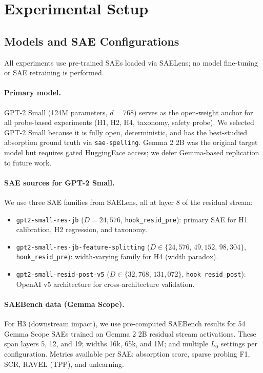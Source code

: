 \documentclass{article}
\begin{document}
\section{Experimental Setup}
\label{sec:setup}

\subsection{Models and SAE Configurations}

All experiments use pre-trained SAEs loaded via SAELens; no model fine-tuning or SAE retraining is performed.

\paragraph{Primary model.} GPT-2 Small (124M parameters, $d = 768$) serves as the open-weight anchor for all probe-based experiments (H1, H2, H4, taxonomy, safety probe). We selected GPT-2 Small because it is fully open, deterministic, and has the best-studied absorption ground truth via \texttt{sae-spelling}. Gemma 2 2B was the original target model but requires gated HuggingFace access; we defer Gemma-based replication to future work.

\paragraph{SAE sources for GPT-2 Small.} We use three SAE families from SAELens, all at layer 8 of the residual stream:
\begin{itemize}
  \item \texttt{gpt2-small-res-jb} ($D = 24{,}576$, \texttt{hook\_resid\_pre}): primary SAE for H1 calibration, H2 regression, and taxonomy.
  \item \texttt{gpt2-small-res-jb-feature-splitting} ($D \in \{24{,}576,\, 49{,}152,\, 98{,}304\}$, \texttt{hook\_resid\_pre}): width-varying family for H4 (width paradox).
  \item \texttt{gpt2-small-resid-post-v5} ($D \in \{32{,}768,\, 131{,}072\}$, \texttt{hook\_resid\_post}): OpenAI v5 architecture for cross-architecture validation.
\end{itemize}

\paragraph{SAEBench data (Gemma Scope).} For H3 (downstream impact), we use pre-computed SAEBench results \citep{karvonen2025saebench} for 54 Gemma Scope SAEs trained on Gemma 2 2B residual stream activations. These span layers 5, 12, and 19; widths 16k, 65k, and 1M; and multiple $L_0$ settings per configuration. Metrics available per SAE: absorption score, sparse probing F1, SCR, RAVEL (TPP), and unlearning.
\end{document}
